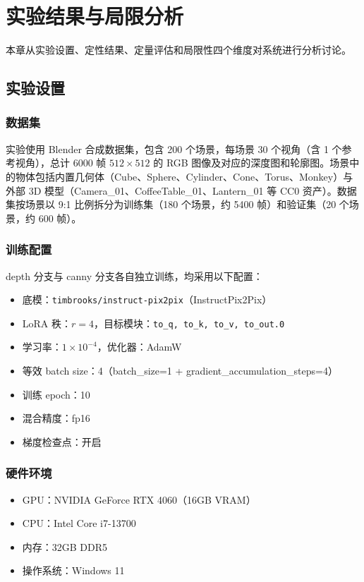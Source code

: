\chapter{实验结果与局限分析}

本章从实验设置、定性结果、定量评估和局限性四个维度对系统进行分析讨论。

\section{实验设置}

\subsection{数据集}

实验使用 Blender 合成数据集，包含 200 个场景，每场景 30 个视角（含 1 个参考视角），总计 6000 帧 $512 \times 512$ 的 RGB 图像及对应的深度图和轮廓图。场景中的物体包括内置几何体（Cube、Sphere、Cylinder、Cone、Torus、Monkey）与外部 3D 模型（Camera\_01、CoffeeTable\_01、Lantern\_01 等 CC0 资产）。数据集按场景以 9:1 比例拆分为训练集（180 个场景，约 5400 帧）和验证集（20 个场景，约 600 帧）。

\subsection{训练配置}

depth 分支与 canny 分支各自独立训练，均采用以下配置：

\begin{itemize}
    \item 底模：\texttt{timbrooks/instruct-pix2pix}（InstructPix2Pix）
    \item LoRA 秩：$r = 4$，目标模块：\texttt{to\_q, to\_k, to\_v, to\_out.0}
    \item 学习率：$1 \times 10^{-4}$，优化器：AdamW
    \item 等效 batch size：4（batch\_size=1 + gradient\_accumulation\_steps=4）
    \item 训练 epoch：10
    \item 混合精度：fp16
    \item 梯度检查点：开启
\end{itemize}

\subsection{硬件环境}

\begin{itemize}
    \item GPU：NVIDIA GeForce RTX 4060（16GB VRAM）
    \item CPU：Intel Core i7-13700
    \item 内存：32GB DDR5
    \item 操作系统：Windows 11
\end{itemize}

